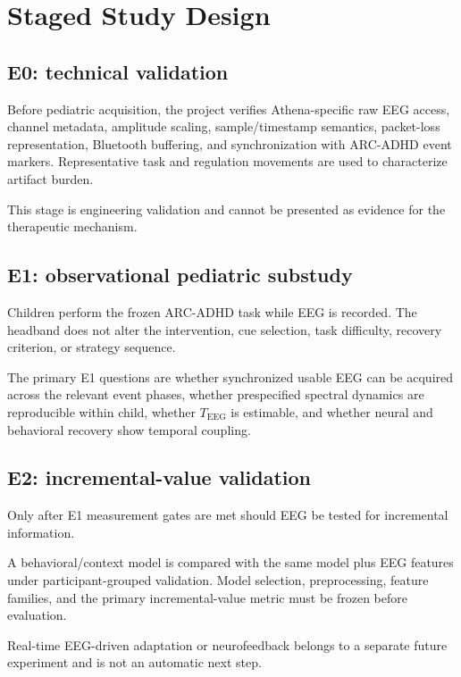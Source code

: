 \section{Staged Study Design}

\subsection{E0: technical validation}

Before pediatric acquisition, the project verifies Athena-specific raw EEG access, channel metadata, amplitude scaling, sample/timestamp semantics, packet-loss representation, Bluetooth buffering, and synchronization with ARC-ADHD event markers. Representative task and regulation movements are used to characterize artifact burden.

This stage is engineering validation and cannot be presented as evidence for the therapeutic mechanism.

\subsection{E1: observational pediatric substudy}

Children perform the frozen ARC-ADHD task while EEG is recorded. The headband does not alter the intervention, cue selection, task difficulty, recovery criterion, or strategy sequence.

The primary E1 questions are whether synchronized usable EEG can be acquired across the relevant event phases, whether prespecified spectral dynamics are reproducible within child, whether \(T_{\mathrm{EEG}}\) is estimable, and whether neural and behavioral recovery show temporal coupling.

\subsection{E2: incremental-value validation}

Only after E1 measurement gates are met should EEG be tested for incremental information.

A behavioral/context model is compared with the same model plus EEG features under participant-grouped validation. Model selection, preprocessing, feature families, and the primary incremental-value metric must be frozen before evaluation.

Real-time EEG-driven adaptation or neurofeedback belongs to a separate future experiment and is not an automatic next step.
